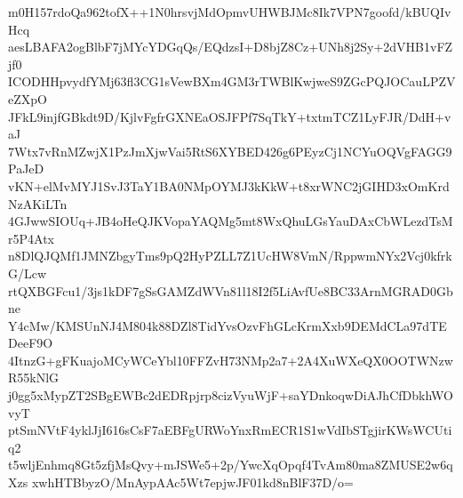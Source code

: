 m0H157rdoQa962tofX++1N0hrsvjMdOpmvUHWBJMc8Ik7VPN7goofd/kBUQIvHcq
aesLBAFA2ogBlbF7jMYcYDGqQs/EQdzsI+D8bjZ8Cz+UNh8j2Sy+2dVHB1vFZjf0
ICODHHpvydfYMj63fl3CG1sVewBXm4GM3rTWBlKwjweS9ZGcPQJOCauLPZVeZXpO
JFkL9injfGBkdt9D/KjlvFgfrGXNEaOSJFPf7SqTkY+txtmTCZ1LyFJR/DdH+vaJ
7Wtx7vRnMZwjX1PzJmXjwVai5RtS6XYBED426g6PEyzCj1NCYuOQVgFAGG9PaJeD
vKN+elMvMYJ1SvJ3TaY1BA0NMpOYMJ3kKkW+t8xrWNC2jGIHD3xOmKrdNzAKiLTn
4GJwwSIOUq+JB4oHeQJKVopaYAQMg5mt8WxQhuLGsYauDAxCbWLezdTsMr5P4Atx
n8DlQJQMf1JMNZbgyTms9pQ2HyPZLL7Z1UcHW8VmN/RppwmNYx2Vcj0kfrkG/Lcw
rtQXBGFcu1/3js1kDF7gSsGAMZdWVn81l18I2f5LiAvfUe8BC33ArnMGRAD0Gbne
Y4cMw/KMSUnNJ4M804k88DZl8TidYvsOzvFhGLcKrmXxb9DEMdCLa97dTEDeeF9O
4ItnzG+gFKuajoMCyWCeYbl10FFZvH73NMp2a7+2A4XuWXeQX0OOTWNzwR55kNlG
j0gg5xMypZT2SBgEWBc2dEDRpjrp8cizVyuWjF+saYDnkoqwDiAJhCfDbkhWOvyT
ptSmNVtF4yklJjI616sCsF7aEBFgURWoYnxRmECR1S1wVdIbSTgjirKWsWCUtiq2
t5wljEnhmq8Gt5zfjMsQvy+mJSWe5+2p/YwcXqOpqf4TvAm80ma8ZMUSE2w6qXzs
xwhHTBbyzO/MnAypAAc5Wt7epjwJF01kd8nBlF37D/o=
